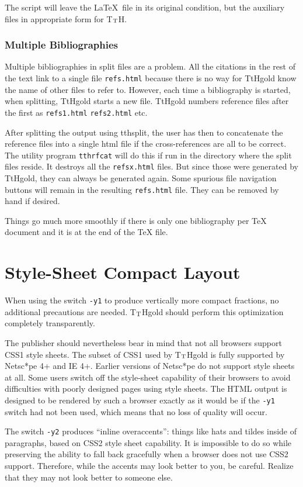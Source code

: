 \documentclass[12pt]{article}
\def\tth{T$_{\rm T}$H}
\begin{document}
\noindent The script will leave the \LaTeX\ file in its original condition,
but the auxiliary files in appropriate form for \tth.

\subsubsection{Multiple Bibliographies}
Multiple bibliographies in split files are a problem. All the
citations in the rest of the text link to a single file
\verb!refs.html! because there is no way for TtHgold know the name of other
files to refer to. However, each time a bibliography is started,
when splitting, TtHgold starts a new file. TtHgold numbers reference
files after the first as \verb!refs1.html! \verb!refs2.html!
etc. 

After splitting the output using tthsplit, the user has then to
concatenate the reference files into a single html file if the
cross-references are all to be correct. The utility program
\verb!tthrfcat! will do this if run in the directory where the split
files reside. It destroys all the \verb!refsx.html! files. But since those
were generated by TtHgold, they can always be generated again. Some
spurious file navigation buttons will remain in the resulting
\verb!refs.html! file. They can be removed by hand if desired.

Things go much more smoothly if there is only one bibliography per TeX
document and it is at the end of the TeX file.

\section{Style-Sheet Compact Layout}

When using the switch \verb!-y1! to  produce vertically more compact
fractions, no additional precautions are needed. \tth{}gold should
perform this optimization completely transparently.

The publisher should nevertheless bear in mind that not all browsers
support CSS1 style sheets. The subset of CSS1 used by \tth{}gold is
fully supported by Netsc*pe 4+ and IE 4+. Earlier versions of Netsc*pe
do not support style sheets at all. Some users switch off the
style-sheet capability of their browsers to avoid difficulties with
poorly designed pages using style sheets. The HTML output is designed to be
rendered by such a browser exactly as it would be if the \verb!-y1!
switch had not been used, which means that no loss of quality will
occur.

The switch \verb!-y2! produces ``inline overaccents'': things like
hats and tildes inside of paragraphs, based on CSS2 style sheet
capability. It is impossible to do so while preserving the ability to
fall back gracefully when a browser does not use CSS2
support. Therefore, while the accents may look better to you, be
careful. Realize that they may not look better to someone else.
\end{document}
